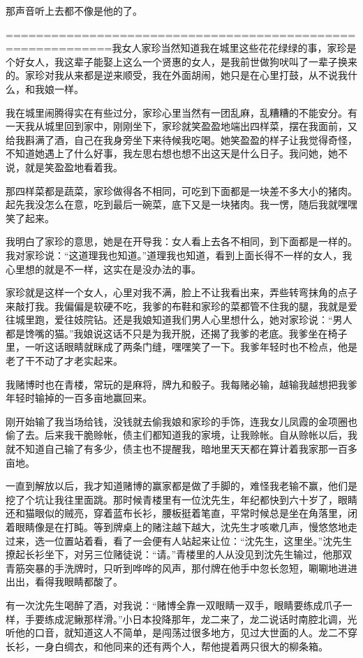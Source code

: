 \documentclass[12pt,UTF8]{ctexbook}
\begin{document}
那声音听上去都不像是他的了。

============================================================我女人家珍当然知道我在城里这些花花绿绿的事，家珍是个好女人，我这辈子能娶上这么一个贤惠的女人，是我前世做狗吠叫了一辈子换来的。家珍对我从来都是逆来顺受，我在外面胡闹，她只是在心里打鼓，从不说我什么，和我娘一样。

我在城里闹腾得实在有些过分，家珍心里当然有一团乱麻，乱糟糟的不能安分。有一天我从城里回到家中，刚刚坐下，家珍就笑盈盈地端出四样菜，摆在我面前，又给我斟满了酒，自己在我身旁坐下来待候我吃喝。她笑盈盈的样子让我觉得奇怪，不知道她遇上了什么好事，我左思右想也想不出这天是什么日子。我问她，她不说，就是笑盈盈地看着我。

那四样菜都是蔬菜，家珍做得各不相同，可吃到下面都是一块差不多大小的猪肉。起先我没怎么在意，吃到最后一碗菜，底下又是一块猪肉。我一愣，随后我就嘿嘿笑了起来。

我明白了家珍的意思，她是在开导我：女人看上去各不相同，到下面都是一样的。我对家珍说：“这道理我也知道。”道理我也知道，看到上面长得不一样的女人，我心里想的就是不一样，这实在是没办法的事。

家珍就是这样一个女人，心里对我不满，脸上不让我看出来，弄些转弯抹角的点子来敲打我。我偏偏是软硬不吃，我爹的布鞋和家珍的菜都管不住我的腿，我就是爱往城里跑，爱往妓院钻。还是我娘知道我们男人心里想什么，她对家珍说：“男人都是馋嘴的猫。”我娘说这话不只是为我开脱，还揭了我爹的老底。我爹坐在椅子里，一听这话眼睛就眯成了两条门缝，嘿嘿笑了一下。我爹年轻时也不检点，他是老了干不动了才老实起来。

我赌博时也在青楼，常玩的是麻将，牌九和骰子。我每赌必输，越输我越想把我爹年轻时输掉的一百多亩地赢回来。

刚开始输了我当场给钱，没钱就去偷我娘和家珍的手饰，连我女儿凤霞的金项圈也偷了去。后来我干脆赊帐，债主们都知道我的家境，让我赊帐。自从赊帐以后，我就不知道自己输了有多少，债主也不提醒我，暗地里天天都在算计着我家那一百多亩地。

一直到解放以后，我才知道赌博的赢家都是做了手脚的，难怪我老输不赢，他们是挖了个坑让我往里面跳。那时候青楼里有一位沈先生，年纪都快到六十岁了，眼睛还和猫眼似的贼亮，穿着蓝布长衫，腰板挺着笔直，平常时候总是坐在角落里，闭着眼睛像是在打盹。等到牌桌上的赌注越下越大，沈先生才咳嗽几声，慢悠悠地走过来，选一位置站着看，看了一会便有人站起来让位：“沈先生，这里坐。”沈先生撩起长衫坐下，对另三位赌徒说：“请。”青楼里的人从没见到沈先生输过，他那双青筋突暴的手洗牌时，只听到哗哗的风声，那付牌在他手中忽长忽短，唰唰地进进出出，看得我眼睛都酸了。

有一次沈先生喝醉了酒，对我说：“赌博全靠一双眼睛一双手，眼睛要练成爪子一样，手要练成泥鳅那样滑。”小日本投降那年，龙二来了，龙二说话时南腔北调，光听他的口音，就知道这人不简单，是闯荡过很多地方，见过大世面的人。龙二不穿长衫，一身白绸衣，和他同来的还有两个人，帮他提着两只很大的柳条箱。
\end{document}
